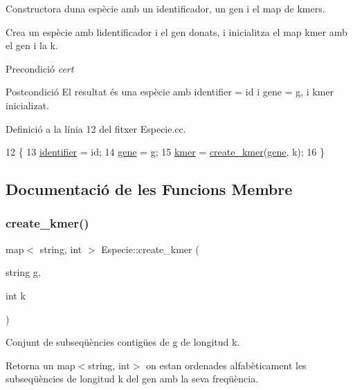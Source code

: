 Constructora d\textquotesingle{}una espècie amb un identificador, un gen i el map de kmers. 

Crea un espècie amb l\textquotesingle{}identificador i el gen donats, i inicialitza el map kmer amb el gen i la k.

\begin{DoxyPrecond}{Precondició}
{\itshape cert} 
\end{DoxyPrecond}
\begin{DoxyPostcond}{Postcondició}
El resultat és una espècie amb identifier = id i gene = g, i kmer inicializat. 
\end{DoxyPostcond}


Definició a la línia 12 del fitxer Especie.\+cc.


\begin{DoxyCode}
12                                            \{
13     \hyperlink{class_especie_a2c63b7e3b74779e58feb0a2446faabd1}{identifier} = id;
14     \hyperlink{class_especie_affa45d2f858415333f43caf121c7663a}{gene} = g;
15     \hyperlink{class_especie_aa438e3e2f785d96c0ac51e83f60a5879}{kmer} = \hyperlink{class_especie_a7e6c7615ab5458259c1f20bcd68ebd80}{create\_kmer}(\hyperlink{class_especie_affa45d2f858415333f43caf121c7663a}{gene}, k);
16 \}
\end{DoxyCode}


\subsection{Documentació de les Funcions Membre}
\mbox{\label{class_especie_a7e6c7615ab5458259c1f20bcd68ebd80}} 
\subsubsection{\texorpdfstring{create\+\_\+kmer()}{create\_kmer()}}
{\footnotesize\ttfamily map$<$ string, int $>$ Especie\+::create\+\_\+kmer (\begin{DoxyParamCaption}\item[{string}]{g,  }\item[{int}]{k }\end{DoxyParamCaption})}



Conjunt de subseqüències contigües de g de longitud k. 

Retorna un map$<$string, int$>$ on estan ordenades alfabèticament les subseqüències de longitud k del gen amb la seva freqüència.

